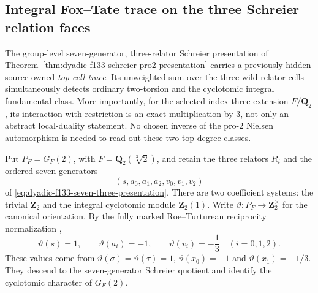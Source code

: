 
\subsection{Integral Fox--Tate trace on the three Schreier relation faces}
\label{subsec:dyadic-f134-relative-fox-tate}

The group-level seven-generator, three-relator
Schreier presentation of
Theorem~\ref{thm:dyadic-f133-schreier-pro2-presentation}
carries a previously hidden source-owned
\emph{top-cell trace}.  Its unweighted
sum over the three wild relator cells
simultaneously detects ordinary
two-torsion and the cyclotomic integral
fundamental class.  More importantly,
for the selected index-three extension
$F/\mathbf Q_2$, its interaction with
restriction is an exact multiplication
by $3$, not only an abstract
local-duality statement.
No chosen inverse of the
pro-$2$ Nielsen automorphism
is needed to read out these two
top-degree classes.

Put $P_F=G_F(2)$, with
$F=\mathbf Q_2(\sqrt[3]2)$, and retain
the three relators $R_i$ and
the ordered seven generators
\[
(s,a_0,a_1,a_2,v_0,v_1,v_2)
\]
of
\eqref{eq:dyadic-f133-seven-three-presentation}.
There are two coefficient systems:
the trivial $\mathbf Z_2$
and the integral cyclotomic
module $\mathbf Z_2(1)$.
Write $\vartheta:P_F\to\mathbf Z_2^\times$
for the canonical orientation.
By the fully marked
Roe--Turturean reciprocity
normalization \cite{RoeTurtureanGQ2},
\begin{equation}\label{eq:dyadic-f134-orientation-values}
\boxed{
\vartheta(s)=1,\qquad
\vartheta(a_i)=-1,\qquad
\vartheta(v_i)=-\frac13
\quad(i=0,1,2).
}
\end{equation}
These values come from
$\vartheta(\sigma)=\vartheta(\tau)=1$,
$\vartheta(x_0)=-1$ and
$\vartheta(x_1)=-1/3$.
They descend to the seven-generator
Schreier quotient and identify
the cyclotomic character of $G_F(2)$.

